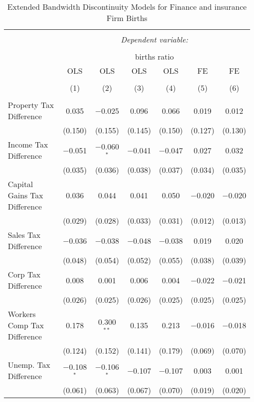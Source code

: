 
\begin{table}[!htbp] \centering 
  \caption{Extended Bandwidth Discontinuity Models for  Finance and insurance Firm Births} 
  \label{52rd} 
\begin{tabular}{@{\extracolsep{5pt}}lcccccc} 
\\[-1.8ex]\hline 
\hline \\[-1.8ex] 
 & \multicolumn{6}{c}{\textit{Dependent variable:}} \\ 
\cline{2-7} 
\\[-1.8ex] & \multicolumn{6}{c}{births ratio} \\ 
 & OLS & OLS & OLS & OLS & FE & FE \\ 
\\[-1.8ex] & (1) & (2) & (3) & (4) & (5) & (6)\\ 
\hline \\[-1.8ex] 
 Property Tax Difference & 0.035 & $-$0.025 & 0.096 & 0.066 & 0.019 & 0.012 \\ 
  & (0.150) & (0.155) & (0.145) & (0.150) & (0.127) & (0.130) \\ 
  Income Tax Difference & $-$0.051 & $-$0.060$^{*}$ & $-$0.041 & $-$0.047 & 0.027 & 0.032 \\ 
  & (0.035) & (0.036) & (0.038) & (0.037) & (0.034) & (0.035) \\ 
  Capital Gains Tax Difference & 0.036 & 0.044 & 0.041 & 0.050 & $-$0.020 & $-$0.020 \\ 
  & (0.029) & (0.028) & (0.033) & (0.031) & (0.012) & (0.013) \\ 
  Sales Tax Difference & $-$0.036 & $-$0.038 & $-$0.048 & $-$0.038 & 0.019 & 0.020 \\ 
  & (0.048) & (0.054) & (0.052) & (0.055) & (0.038) & (0.039) \\ 
  Corp Tax Difference & 0.008 & 0.001 & 0.006 & 0.004 & $-$0.022 & $-$0.021 \\ 
  & (0.026) & (0.025) & (0.026) & (0.025) & (0.025) & (0.025) \\ 
  Workers Comp Tax Difference & 0.178 & 0.300$^{**}$ & 0.135 & 0.213 & $-$0.016 & $-$0.018 \\ 
  & (0.124) & (0.152) & (0.141) & (0.179) & (0.069) & (0.070) \\ 
  Unemp. Tax Difference & $-$0.108$^{*}$ & $-$0.106$^{*}$ & $-$0.107 & $-$0.107 & 0.003 & 0.001 \\ 
  & (0.061) & (0.063) & (0.067) & (0.070) & (0.019) & (0.020) \\ 

\end{tabular}
\end{table}
